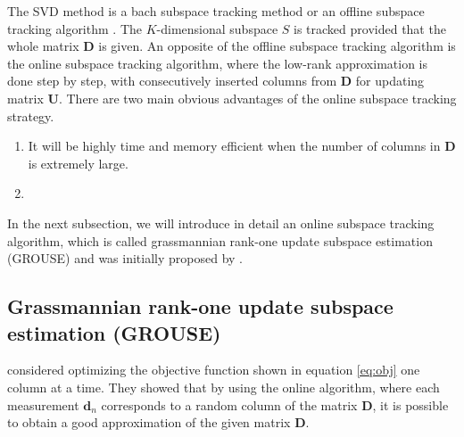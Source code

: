 The SVD method is a bach subspace tracking method or an offline subspace tracking algorithm \cite[]{laura2010}. The $K$-dimensional subspace $S$ is tracked provided that the whole matrix $\mathbf{D}$ is given. An opposite of the offline subspace tracking algorithm is the online subspace tracking algorithm, where the low-rank approximation is done step by step, with consecutively inserted columns from $\mathbf{D}$ for updating matrix $\mathbf{U}$. There are two main obvious advantages of the online subspace tracking strategy. 
\begin{enumerate}
\item It will be highly time and memory efficient when the number of columns in $\mathbf{D}$ is extremely large.
\item {} 
\end{enumerate}  
  In the next subsection, we will introduce in detail an online subspace tracking algorithm, which is called grassmannian rank-one update subspace estimation (GROUSE) and was initially proposed by \cite{laura2010}.
 
\subsection{Grassmannian rank-one update subspace estimation (GROUSE)}
\cite{laura2010} considered optimizing the objective function shown in equation \ref{eq:obj} one column at a time. They showed that by using the online algorithm, where each measurement $\mathbf{d}_n$ corresponds to a random column of the matrix $\mathbf{D}$, it is possible to obtain a good approximation of the given matrix $\mathbf{D}$. %

